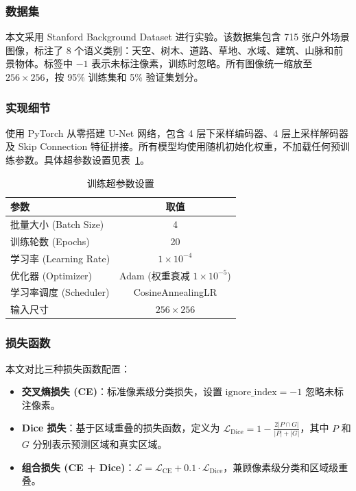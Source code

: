 \documentclass{article}
\begin{document}
\subsubsection{数据集}
本文采用 Stanford Background Dataset 进行实验。该数据集包含 715 张户外场景图像，标注了 8 个语义类别：天空、树木、道路、草地、水域、建筑、山脉和前景物体。标签中 $-1$ 表示未标注像素，训练时忽略。所有图像统一缩放至 $256 \times 256$，按 95\% 训练集和 5\% 验证集划分。

\subsubsection{实现细节}
使用 PyTorch 从零搭建 U-Net 网络，包含 4 层下采样编码器、4 层上采样解码器及 Skip Connection 特征拼接。所有模型均使用随机初始化权重，不加载任何预训练参数。具体超参数设置见表~\ref{tab:task3_settings}。

\begin{table}[htbp]
\centering
\caption{训练超参数设置}
\label{tab:task3_settings}
\begin{tabular}{lc}
\hline
参数 & 取值 \\
\hline
批量大小 (Batch Size) & 4 \\
训练轮数 (Epochs) & 20 \\
学习率 (Learning Rate) & $1 \times 10^{-4}$ \\
优化器 (Optimizer) & Adam (权重衰减 $1 \times 10^{-5}$) \\
学习率调度 (Scheduler) & CosineAnnealingLR \\
输入尺寸 & $256 \times 256$ \\
\hline
\end{tabular}
\end{table}

\subsubsection{损失函数}
本文对比三种损失函数配置：

\begin{itemize}
    \item \textbf{交叉熵损失 (CE)}：标准像素级分类损失，设置 $\text{ignore\_index} = -1$ 忽略未标注像素。
    \item \textbf{Dice 损失}：基于区域重叠的损失函数，定义为 $\mathcal{L}_{\text{Dice}} = 1 - \frac{2|P \cap G|}{|P| + |G|}$，其中 $P$ 和 $G$ 分别表示预测区域和真实区域。
    \item \textbf{组合损失 (CE + Dice)}：$\mathcal{L} = \mathcal{L}_{\text{CE}} + 0.1 \cdot \mathcal{L}_{\text{Dice}}$，兼顾像素级分类和区域级重叠。
\end{itemize}
\end{document}
